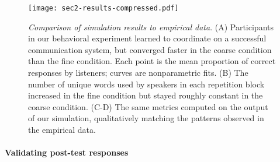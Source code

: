 \begin{figure}[t]
\begin{center}
\texttt{[image: sec2-results-compressed.pdf]}
\vspace{1ex}
\caption{\emph{Comparison of simulation results to empirical data}. (A) Participants in our behavioral experiment learned to coordinate on a successful communication system, but converged faster in the coarse condition than the fine condition. Each point is the mean proportion of correct responses by listeners; curves are nonparametric fits. (B) The number of unique words used by speakers in each repetition block increased in the fine condition but stayed roughly constant in the coarse condition. (C-D) The same metrics computed on the output of our simulation, qualitatively matching the patterns observed in the empirical data.}
\label{fig:sec2Results}
\end{center}
\end{figure}
%
%

\paragraph{Validating post-test responses}

